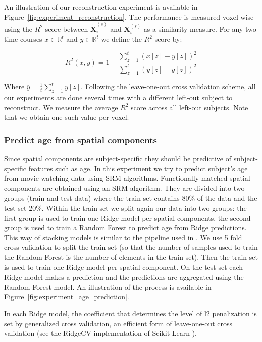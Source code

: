 An illustration of our reconstruction experiment is available in Figure~\ref{fig:experiment_reconstruction}.
%
The performance is measured voxel-wise using the $R^2$ score between $\widetilde{\mathbf{X}}_i^{(s)}$ and $\mathbf{X}_i^{(s)}$ as a similarity measure.
For any two time-courses $x \in \mathbb{R}^t$ and $y \in \mathbb{R}^t$ we define the $R^2$ score by:

\[
	R^2(x, y) = 1 - \frac{\sum_{z=1}^t (x[z] - y[z])^2}{\sum_{z=1}^t (y[z] - \overline{y}[z])^2} 
\]

Where $\overline{y} = \frac{1}{t}\sum_{z=1}^t y[z]$.
%
Following the leave-one-out cross validation scheme, all our experiments are done several times with a different left-out subject to reconstruct. 
%
We measure the average $R^2$ score across  all left-out subjects. Note that we obtain one such value per voxel.

\subsubsection{Predict age from spatial components}
Since spatial components are subject-specific they should be predictive of subject-specific features such as age.
%
In this experiment we try to predict subject's age from movie-watching data using SRM algorithms.
%
Functionally matched spatial components are obtained using an SRM algorithm.
%
They are divided into two groups (train and test data) where the train set contains 80\% of the data and the test set 20\%.
%
Within the train set we split again our data into two groups: the first group is used to train one Ridge model per spatial components, the second group is used to train a Random Forest to predict age from Ridge predictions. This way of stacking models is similar to the pipeline used in \cite{rahim2017joint}.
%
We use 5 fold cross validation to split the train set (so that the number of samples used to train the Random Forest is the number of elements in the train set).
%
Then the train set is used to train one Ridge model per spatial component.
%
On the test set each Ridge model makes a prediction and the predictions are aggregated using the Random Forest model.
%
An illustration of the process is available in Figure~\ref{fig:experiment_age_prediction}. 

In each Ridge model, the coefficient that determines the level of l2 penalization is set by generalized cross validation, an efficient form of leave-one-out cross validation (see the RidgeCV implementation of Scikit Learn \cite{pedregosa2011scikit}).

